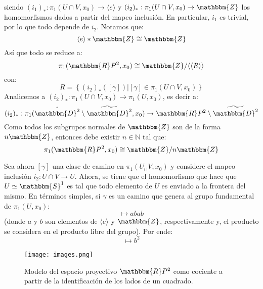 \documentclass[12pt]{report}
\theoremstyle{largebreak}
\newcommand\cf[3]{\ensuremath{#1:#2\rightarrow#3}}
\newcommand{\bbm}[1]{\ensuremath{\mathbbm{#1}}}
\newcommand{\gen}[1]{\ensuremath{\langle#1\rangle}}
\begin{document}
\begin{sol}
\begin{equation*}
        \end{equation*}
        siendo $\cf{(i_1)_*}{\pi_1(U\cap V,x_0)}{\gen{e}}$ y $\cf{(i_2)_*}{\pi_1(U\cap V,x_0)}{\bbm{Z}}$ los homomorfismos dados a partir del mapeo inclusión. En particular, $i_1$ es trivial, por lo que todo depende de $i_2$. Notamos que:
        \begin{equation*}
            \gen{e}*\bbm{Z}\cong\bbm{Z}
        \end{equation*}
        Así que todo se reduce a:
        \begin{equation*}
            \pi_1(\bbm{R}P^2,x_0)\cong\bbm{Z}/\gen{\gen{R}}
        \end{equation*}
        con:
        \begin{equation*}
            R=\left\{(i_2)_*([\gamma])\Big|[\gamma]\in\pi_1(U\cap V,x_0) \right\}
        \end{equation*}
        Analicemos a $\cf{(i_2)_*}{\pi_1(U\cap V,x_0)}{\pi_1(U,x_0)}$, es decir a:
        \begin{equation*}
            \cf{(i_2)_*}{\pi_1(\mathring{\bbm{D}^2}\setminus\widetilde{\bbm{D}^2},x_0)}{\bbm{R}P^2\setminus\widetilde{\bbm{D}^2}}
        \end{equation*}
        Como todos los subgrupos normales de $\bbm{Z}$ son de la forma $n\bbm{Z}$, entonces debe existir $n\in\mathbb{N}$ tal que:
        \begin{equation*}
            \pi_1(\bbm{R}P^2,x_0)\cong\bbm{Z}/n\bbm{Z}
        \end{equation*}

        Sea ahora $[\gamma]$ una clase de camino en $\pi_1(U_\cap V,x_0)$ y considere el mapeo inclusión $\cf{i_2}{U\cap V}{U}$. Ahora, se tiene que el homomorfismo que hace que $U\simeq\bbm{S}^1$ es tal que todo elemento de $U$ es enviado a la frontera del mismo. En términos simples, si $\gamma$ es un camino que genera al grupo fundamental de $\pi_1(U,x_0)$:
        \begin{equation*}
            [\gamma]\mapsto abab
        \end{equation*}
        (donde $a$ y $b$ son elementos de $\gen{e}$ y $\bbm{Z}$, respectivamente y, el producto se considera en el producto libre del grupo). Por ende:
        \begin{equation*}
            [\gamma]\mapsto b^2
        \end{equation*}

        \begin{figure}
            \begin{center}
                \texttt{[image: images.png]}
            \end{center}
            \caption{Modelo del espacio proyectivo $\bbm{R}P^2$ como cociente a partir de la identificación de los lados de un cuadrado.}
        \end{figure}


\end{sol}
\end{document}
